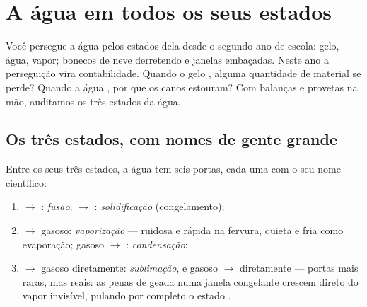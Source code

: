 \chapter{A água em todos os seus estados}\label{ch:g6:water-states}

Você persegue a água pelos estados dela desde o segundo ano de
escola: gelo, água, vapor; bonecos de neve derretendo e janelas
embaçadas. Neste ano a perseguição vira contabilidade. Quando o gelo
, alguma quantidade de material se perde? Quando a água
, por que os canos estouram? Com balanças e provetas na mão,
auditamos os três estados da água.

\section{Os três estados, com nomes de gente grande}

\begin{definition}\label{def:g6:water-states:changes}
Entre os seus três estados, a água tem seis portas, cada uma com o
seu nome científico:
\begin{enumerate}
  \item {} $\to$ : \emph{fusão}; 
        $\to$ : \emph{solidificação}
        (congelamento);
  \item {} $\to$ gasoso: \emph{vaporização}
        --- ruidosa e rápida na fervura, quieta e fria como
        evaporação; gasoso $\to$ :
        \emph{condensação};
  \item {} $\to$ gasoso diretamente:
        \emph{sublimação}, e gasoso $\to$ 
        diretamente --- portas mais raras, mas reais: as penas de
        geada numa janela congelante crescem direto do vapor
        invisível, pulando por completo o estado .
\end{enumerate}
\end{definition}

